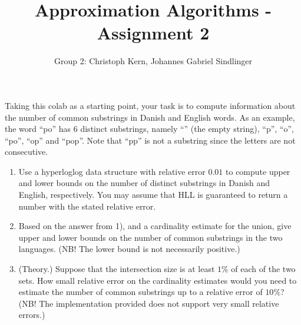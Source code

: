 \documentclass{article}
\title{Approximation Algorithms - Assignment 2}
\author{Group 2: Christoph Kern, Johannes Gabriel Sindlinger}
\begin{document}
\maketitle

Taking this colab as a starting point, your task is to compute information about the number of common substrings in Danish and English words. As an example, the word ``po'' has 6 distinct substrings, namely ``'' (the empty string), ``p'', ``o'', ``po'', ``op'' and ``pop''. Note that ``pp'' is not a substring since the letters are not consecutive.

\begin{enumerate}
    \item Use a hyperloglog data structure with relative error $0.01$ to compute upper and lower bounds on the number of distinct substrings in Danish and English, respectively. You may assume that HLL is guaranteed to return a number with the stated relative error.
    \item Based on the answer from 1), and a cardinality estimate for the union, give upper and lower bounds on the number of common substrings in the two languages. (NB! The lower bound is not necessarily positive.)
    \item (Theory.) Suppose that the intersection size is at least $1\%$ of each of the two sets. How small relative error on the cardinality estimates would you need to estimate the number of common substrings up to a relative error of $10\%$? (NB! The implementation provided does not support very small relative errors.)
    
\end{enumerate}
\end{document}
